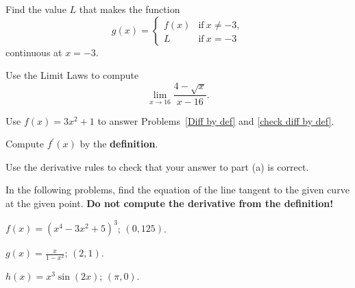 \documentclass[12pt]{amsart}
\begin{document}
\vspace{2in}

\begin{thm}[3 Points]\label{fix discont}
    Find the value \(L\) that makes the function
    \[g(x) = \left\{\begin{matrix}
    f(x) & \text{if}\ x \neq -3,\\
    L & \text{if}\ x = -3
    \end{matrix}
    \right.\]
    continuous at \(x = -3\).
\end{thm}

\newpage

\begin{thm}[10 Points]
  Use the Limit Laws to compute
  \[\lim_{x \to 16} \frac{4 - \sqrt{x}}{x - 16}.\]
\end{thm}

\vspace{3in}

\noindent Use \(f(x) = 3x^2 + 1\) to answer Problems~\ref{Diff by def} and \ref{check diff by def}.

\begin{thm}[10 Points]\label{Diff by def}
  Compute \(f^\prime(x)\) by the \textbf{definition}.
\end{thm}

\vspace{3in}

\begin{thm}[5 Points]\label{check diff by def}
  Use the derivative rules to check that your answer to part (a) is correct.
\end{thm}

\newpage

\noindent In the following problems, find the equation of the line tangent to the given curve at the given point.
\textbf{Do not compute the derivative from the definition!}
\begin{thm}[15 Points]
  \(\displaystyle{f(x) = (x^4 - 3x^2 + 5)^3}\); \((0,125)\).
\end{thm}

\vspace{2in}
\begin{thm}[15 Points]
  \(\displaystyle{g(x) = \frac{x}{1 - x^2}}\); \((2,1)\).
\end{thm}

\vspace{2in}

\begin{thm}[15 Points]
  \(\displaystyle{h(x) = x^3\sin(2x)}\); \((\pi,0)\).
\end{thm}
\end{document}
